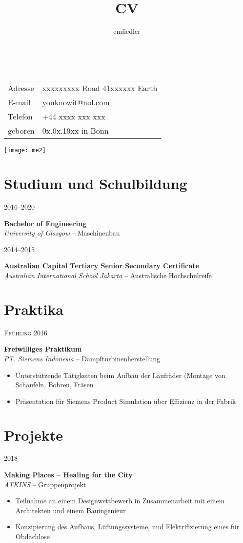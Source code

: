 \documentclass[a4paper]{article}
\title{CV}
\author{emfiedler}
\makeatletter
\renewcommand{\maketitle}{
\begin{flushleft}
{\Huge
\theauthor}\\
\vspace{3mm}
\hspace{3mm} 
\begingroup
\renewcommand{\arraystretch}{1.2}
\begin{tabular}{@{} p{15mm} p{50mm}}
	Adresse	&xxxxxxxxx Road 41\newline xxxxxx Earth\\
	E-mail 	&youknowit@aol.com\\
	Telefon	&+44 xxxx xxx xxx\\
	geboren	&0x.0x.19xx in Bonn
\end{tabular}
\endgroup

\end{flushleft}
}
\newcommand{\entry}[4]{

	\begin{minipage}[t]{.20\textwidth}
		\hfill \textsc{#1}

	\end{minipage}
	\hfill\vline\hfill
	\begin{minipage}[t]{.75\textwidth}
		\textbf{#2}\\ 
		\textit{#3}    
		#4

	\end{minipage} 
	\vspace{.25cm}

}
\makeatother
\begin{document}

\begin{minipage}{0.73\textwidth}
\maketitle
\end{minipage}
\begin{minipage}{0.25\textwidth}
	\hspace{2mm} 
	\vspace{-2mm} 
	\texttt{[image: me2]}
\end{minipage}

\vspace{1em}

\section{Studium und Schulbildung}

\entry{2016--2020}{Bachelor of Engineering}{University of Glasgow}{-- Maschinenbau}

\entry{2014--2015}{Australian Capital Tertiary Senior Secondary Certificate}{Australian International School Jakarta}{-- Australische Hochschulreife}

\section{Praktika}

\entry{Fr{\"u}hling 2016}{Freiwilliges Praktikum}{PT. Siemens Indonesia}{-- Dampfturbinenherstellung\vspace{-.25cm} 
	\begin{itemize}[leftmargin=*]
		\setlength{\itemsep}{-3pt}
		\item Unterst{\"u}tzende T{\"a}tigkeiten beim Aufbau der L{\"a}ufr{\"a}der \newline \phantom{W}(Montage von Schaufeln, Bohren, Fr{\"a}sen
		\item Pr{\"a}sentation f{\"u}r Siemens Product Simulation {\"u}ber Effizienz in der Fabrik
	\end{itemize}	
}

\section{Projekte}

\entry{2018}{Making Places -- Healing for the City}{ATKINS}{-- Gruppenprojekt
\vspace{-.25cm} 
	\begin{itemize}[leftmargin=*]
		\setlength{\itemsep}{-3pt}
	\item Teilnahme an einem Designwettbewerb in Zusammenarbeit mit einem \newline\phantom{W}Architekten und einem Bauingenieur 
	\item Konzipierung des Aufbaus, L{\"u}ftungssysteme, und Elektrifizierung \newline\phantom{W}eines \glqq{Container-Home\grqq} f{\"u}r Obdachlose
	\end{itemize}
}
\end{document}
